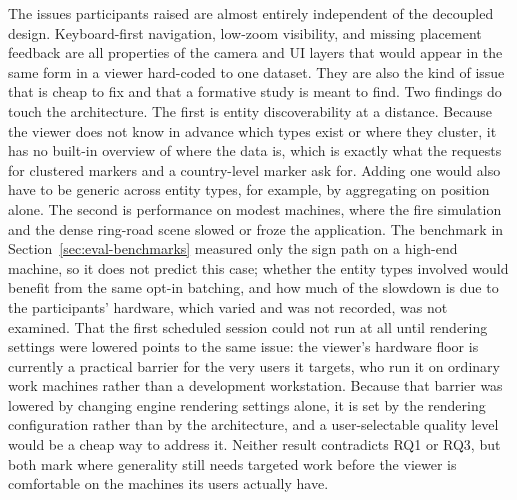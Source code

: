 The issues participants raised are almost entirely independent of the decoupled design. Keyboard-first navigation, low-zoom visibility, and missing placement feedback are all properties of the camera and UI layers that would appear in the same form in a viewer hard-coded to one dataset. They are also the kind of issue that is cheap to fix and that a formative study is meant to find. Two findings do touch the architecture. The first is entity discoverability at a distance. Because the viewer does not know in advance which types exist or where they cluster, it has no built-in overview of where the data is, which is exactly what the requests for clustered markers and a country-level marker ask for. Adding one would also have to be generic across entity types, for example, by aggregating on position alone. The second is performance on modest machines, where the fire simulation and the dense ring-road scene slowed or froze the application. The benchmark in Section~\ref{sec:eval-benchmarks} measured only the sign path on a high-end machine, so it does not predict this case; whether the entity types involved would benefit from the same opt-in batching, and how much of the slowdown is due to the participants' hardware, which varied and was not recorded, was not examined. That the first scheduled session could not run at all until rendering settings were lowered points to the same issue: the viewer's hardware floor is currently a practical barrier for the very users it targets, who run it on ordinary work machines rather than a development workstation. Because that barrier was lowered by changing engine rendering settings alone, it is set by the rendering configuration rather than by the architecture, and a user-selectable quality level would be a cheap way to address it. Neither result contradicts RQ1 or RQ3, but both mark where generality still needs targeted work before the viewer is comfortable on the machines its users actually have.
